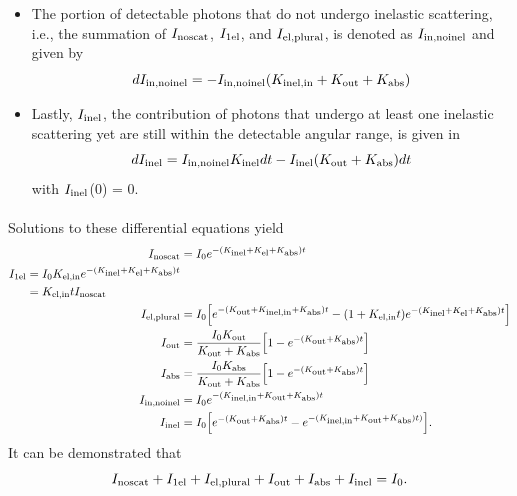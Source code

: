 \documentclass[review]{elsarticle}
\newcommand\nt{\textup{\scriptsize{0}}}
\newcommand\el{\textup{\scriptsize{el}}}
\newcommand\inel{\textup{\scriptsize{inel}}}
\newcommand\elin{\textup{\scriptsize{el,in}}}
\newcommand\inelin{\textup{\scriptsize{inel,in}}}
\newcommand\out{\textup{\scriptsize{out}}}
\newcommand\PI{\textup{\scriptsize{abs}}}
\newcommand\noscat{\textup{\scriptsize{noscat}}}
\newcommand\sel{\textup{\scriptsize{1el}}}
\newcommand\elpl{\textup{\scriptsize{el,plural}}}
\newcommand\innoinel{\textup{\scriptsize{in,noinel}}}
\begin{document}
\begin{itemize}
\item The portion of detectable photons that do not undergo inelastic scattering, i.e., the summation of $I_{\noscat}$, $I_{\sel}$, and $I_{\elpl}$, is denoted as $I_{\innoinel}$ and given by
\begin{equation}
dI_{\innoinel} = -I_{\innoinel}(K_{\inelin}+K_{\out}+K_{\PI})
\end{equation}

\item Lastly, $I_{\inel}$, the contribution of photons that undergo at least one inelastic scattering yet are still within the detectable angular range, is given in
\begin{equation}
dI_{\inel} = I_{\innoinel}K_{\inel} dt - I_{\inel}(K_{\out}+K_{\PI}) dt
\end{equation}
with $I_{\inel}$(0) = 0.

\end{itemize}


\paragraph{} Solutions to these differential equations yield
\begin{align}
I_{\noscat} &= I_{\nt}e^{-(K_{\inel}+K_{\el}+K_{\PI})t}
\label{x1} \\
\begin{split}
\label{x2}
I_{\sel} &= I_{\nt}K_{\elin}e^{-(K_{\inel}+K_{\el}+K_{\PI})t} \\
	&= K_{\elin}tI_{\noscat}
\end{split} \\
I_{\elpl} &= I_{\nt} \Big[ e^{-(K_{\out}+K_{\inelin}+K_{\PI})t} - (1+K_{\elin}t)e^{-(K_{\inel}+K_{\el}+K_{\PI})t} \Big]
\label{x3} \\
I_{\out} &= \frac{I_{\nt}K_{\out}}{K_{\out}+K_{\PI}} \Big[1 - e^{-(K_{\out}+K_{\PI})t}\Big]
\label{x4} \\
I_{\PI} &= \frac{I_{\nt}K_{\PI}}{K_{\out}+K_{\PI}} \Big[1 - e^{-(K_{\out}+K_{\PI})t}\Big]
\label{x5} \\
I_{\innoinel} &= I_{\nt}e^{-(K_{\inelin}+K_{\out}+K_{\PI})t}
\label{x6} \\
I_{\inel} &= I_{\nt}\Big[e^{-(K_{\out}+K_{\PI})t} - e^{-(K_{\inelin}+K_{\out}+K_{\PI})t)}\Big].
\label{x7}
\end{align}
It can be demonstrated that
\begin{equation}
I_{\noscat} + I_{\sel} + I_{\elpl} + I_{\out} + I_{\PI} + I_{\inel} = I_{\nt}.
\end{equation}
\end{document}
